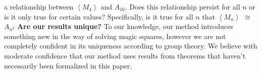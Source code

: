 \documentclass[12pt]{report}
\begin{document}
a relationship between $\left\langle M_4 \right\rangle$ and $A_{16}$. Does this relationship
persist for all $n$ or is it only true for certain values? Specifically, is it true for all $n$
that $\left\langle M_n \right\rangle$ $\cong$ $A_{n^2}$
\linebreak
\linebreak
\textbf{Are our results unique?} To our knowledge, our method introduces something new in the way
of solving magic squares, however we are not completely confident in its uniqueness according to
group theory. We believe with moderate confidence that our method uses results from theorems that
haven't necessarily been formalized in this paper.

\nocite{*}
\printbibliography{}
\end{document}
